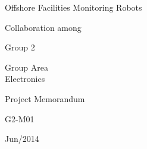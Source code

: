 \begin{center}
  {\LARGE \DORIS}

  {\LARGE Offshore Facilities Monitoring Robots}
  \vfill


  {\LARGE Collaboration among}
  \vspace{0.25cm}

  \vfill


  {\LARGE Group 2}

  {\LARGE Group Area \\ Electronics}
  \vfill


  {\LARGE Project Memorandum}
  \vspace{0.25cm}

  {\LARGE G2-M01}
  \vfill


  {\LARGE Jun/2014}
\end{center}

\newpage



\thispagestyle{empty}


